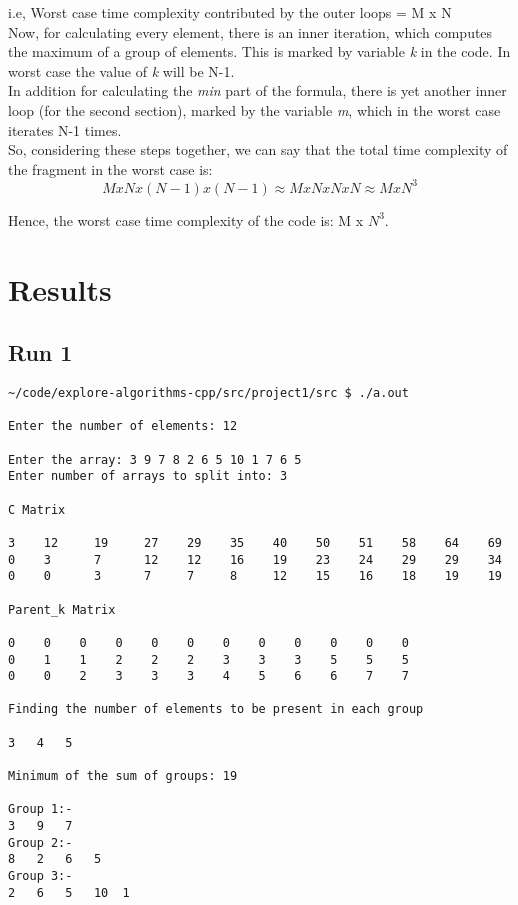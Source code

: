 \documentclass{article}
\begin{document}
i.e, Worst case time complexity contributed by the outer loops = M x N \\

Now, for calculating every element, there is an inner iteration, which computes the maximum of a group of elements. This is marked by variable \textit{k}
in the code. In worst case the value of \textit{k} will be N-1. \\

In addition for calculating the \textit{min} part of the formula, there is yet another inner loop (for the second section),
marked by the variable \textit{m}, which in the worst case iterates N-1 times. \\

So, considering these steps together, we can say that the total time complexity of the fragment in the worst case is:
\[
  M x N x (N-1) x (N-1) \approx M x N x N x N  \approx M x N^{3}
\]

Hence, the worst case time complexity of the code is: M x $N^{3}$.

\section{Results}

\subsection{Run 1}

\begin{verbatim}
~/code/explore-algorithms-cpp/src/project1/src $ ./a.out 

Enter the number of elements: 12

Enter the array: 3 9 7 8 2 6 5 10 1 7 6 5
Enter number of arrays to split into: 3

C Matrix

3    12     19     27    29    35    40    50    51    58    64    69
0    3      7      12    12    16    19    23    24    29    29    34    
0    0      3      7     7     8     12    15    16    18    19    19

Parent_k Matrix

0    0    0    0    0    0    0    0    0    0    0    0    
0    1    1    2    2    2    3    3    3    5    5    5    
0    0    2    3    3    3    4    5    6    6    7    7    

Finding the number of elements to be present in each group

3	4	5	

Minimum of the sum of groups: 19

Group 1:-
3	9	7	
Group 2:-
8	2	6	5	
Group 3:-
2	6	5	10	1
\end{verbatim}
\end{document}
